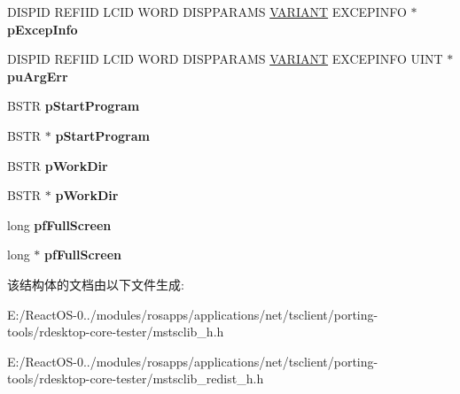 \begin{DoxyCompactItemize}
\item 
\mbox{\label{struct_i_ms_tsc_secured_settings_vtbl_a55aceab0c291f4c98229262c972449ff}} 
D\+I\+S\+P\+ID R\+E\+F\+I\+ID L\+C\+ID W\+O\+RD D\+I\+S\+P\+P\+A\+R\+A\+MS \hyperlink{structtag_v_a_r_i_a_n_t}{V\+A\+R\+I\+A\+NT} E\+X\+C\+E\+P\+I\+N\+FO $\ast$ {\bfseries p\+Excep\+Info}
\item 
\mbox{\label{struct_i_ms_tsc_secured_settings_vtbl_ab21bfc10b35390afa8c24fb34c3fb854}} 
D\+I\+S\+P\+ID R\+E\+F\+I\+ID L\+C\+ID W\+O\+RD D\+I\+S\+P\+P\+A\+R\+A\+MS \hyperlink{structtag_v_a_r_i_a_n_t}{V\+A\+R\+I\+A\+NT} E\+X\+C\+E\+P\+I\+N\+FO U\+I\+NT $\ast$ {\bfseries pu\+Arg\+Err}
\item 
\mbox{\label{struct_i_ms_tsc_secured_settings_vtbl_a5b16ca2c782c9555d7c5c7482f529708}} 
B\+S\+TR {\bfseries p\+Start\+Program}
\item 
\mbox{\label{struct_i_ms_tsc_secured_settings_vtbl_a9cdaaac9bfb28df0e83f0c34f8dc46d0}} 
B\+S\+TR $\ast$ {\bfseries p\+Start\+Program}
\item 
\mbox{\label{struct_i_ms_tsc_secured_settings_vtbl_a80f05e1bcab44d9c6a3481b986f032f0}} 
B\+S\+TR {\bfseries p\+Work\+Dir}
\item 
\mbox{\label{struct_i_ms_tsc_secured_settings_vtbl_a954902e7916769b10002c5bd8afa3b5c}} 
B\+S\+TR $\ast$ {\bfseries p\+Work\+Dir}
\item 
\mbox{\label{struct_i_ms_tsc_secured_settings_vtbl_a254cc5b3d88e78f3f3f145f7d159868f}} 
long {\bfseries pf\+Full\+Screen}
\item 
\mbox{\label{struct_i_ms_tsc_secured_settings_vtbl_a743e36222bc44898453fc773430b7032}} 
long $\ast$ {\bfseries pf\+Full\+Screen}
\end{DoxyCompactItemize}


该结构体的文档由以下文件生成\+:\begin{DoxyCompactItemize}
\item 
E\+:/\+React\+O\+S-\/0../modules/rosapps/applications/net/tsclient/porting-\/tools/rdesktop-\/core-\/tester/mstsclib\+\_\+h.\+h\item 
E\+:/\+React\+O\+S-\/0../modules/rosapps/applications/net/tsclient/porting-\/tools/rdesktop-\/core-\/tester/mstsclib\+\_\+redist\+\_\+h.\+h\end{DoxyCompactItemize}
